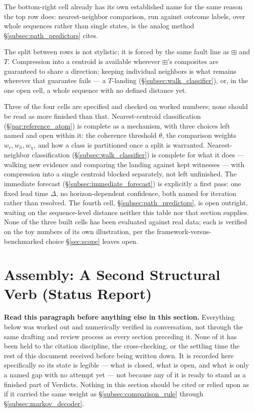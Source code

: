 \documentclass[12pt, a4paper]{article}
\begin{document}
The bottom-right cell already has its own established name for the
same reason the top row does: nearest-neighbor comparison, run
against outcome labels, over whole sequences rather than single
states, is the analog method \S\ref{subsec:path_predictors} cites.

The split between rows is not stylistic; it is forced by the same
fault line as $\boxplus$ and $T$. Compression into a centroid is
available wherever $\boxplus$'s composites are guaranteed to share a
direction; keeping individual neighbors is what remains wherever that
guarantee fails --- a $T$-landing (\S\ref{subsec:walk_classifier}),
or, in the one open cell, a whole sequence with no defined distance
yet.

Three of the four cells are specified and checked on worked numbers;
none should be read as more finished than that. Nearest-centroid
classification (\S\ref{par:reference_atom}) is complete as a
mechanism, with three choices left named and open within it: the
coherence threshold $\theta$, the comparison weights
$w_r,w_{\hat n},w_\chi$, and how a class is partitioned once a split
is warranted. Nearest-neighbor classification
(\S\ref{subsec:walk_classifier}) is complete for what it does ---
walking new evidence and comparing the landing against kept
witnesses --- with compression into a single centroid blocked
separately, not left unfinished. The immediate forecast
(\S\ref{subsec:immediate_forecast}) is explicitly a first pass: one
fixed lead time $\Delta$, no horizon-dependent confidence, both named
for iteration rather than resolved. The fourth cell,
\S\ref{subsec:path_predictors}, is open outright, waiting on the
sequence-level distance neither this table nor that section
supplies. None of the three built cells has been evaluated against
real data; each is verified on the toy numbers of its own
illustration, per the framework-versus-benchmarked choice
\S\ref{sec:scope} leaves open.

\section{Assembly: A Second Structural Verb (Status Report)}
\label{sec:assembly_status}

\textbf{Read this paragraph before anything else in this section.}
Everything below was worked out and numerically verified in
conversation, not through the same drafting and review process as
every section preceding it. None of it has been held to the citation
discipline, the cross-checking, or the settling time the rest of this
document received before being written down. It is recorded here
specifically so its state is legible --- what is closed, what is
open, and what is only a named gap with no attempt yet --- not
because any of it is ready to stand as a finished part of Verdicts.
Nothing in this section should be cited or relied upon as if it
carried the same weight as \S\ref{subsec:comparison_rule} through
\S\ref{subsec:markov_decoder}.
\end{document}
